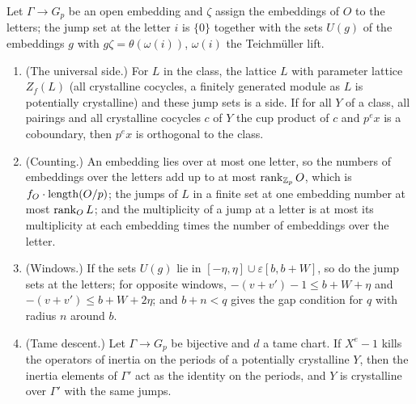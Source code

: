 \begin{lemma}\label{lem:universal-side}
Let $\Gamma\to G_p$ be an open embedding and $\zeta$ assign the embeddings of $O$ to the letters; the jump set at the letter $i$ is $\{0\}$ together with the sets $U(g)$ of the embeddings $g$ with $g\zeta=\theta(\omega(i))$, $\omega(i)$ the Teichm\"uller lift.
\begin{enumerate}[label=\textup{(\alph*)}]
\item (The universal side.) For $L$ in the class, the lattice $L$ with parameter lattice $Z_f(L)$ (all crystalline cocycles, a finitely generated module as $L$ is potentially crystalline) and these jump sets is a side. If for all $Y$ of a class, all pairings and all crystalline cocycles $c$ of $Y$ the cup product of
$c$ and $p^ex$ is a coboundary, then $p^ex$ is orthogonal to the class.
\item (Counting.) An embedding lies over at most one letter, so the numbers of embeddings over the letters add up to at most $\operatorname{rank}_{\mathbb{Z}_p}O$, which is $f_O\cdot\operatorname{length}(O/p)$; the jumps of $L$ in a finite set at one embedding number at most $\operatorname{rank}_OL$; and the multiplicity of a jump at a letter is at most its multiplicity at each
embedding times the number of embeddings over the letter.
\item (Windows.) If the sets $U(g)$ lie in $[-\eta,\eta]\cup\varepsilon[b,b+W]$, so do the jump sets at the letters; for opposite windows, $-(v+v')-1\le b+W+\eta$ and $-(v+v')\le b+W+2\eta$; and $b+n<q$ gives the gap condition for $q$ with radius $n$ around $b$.
\item (Tame descent.) Let $\Gamma\to G_p$ be bijective and $d$ a tame chart. If $X^e-1$ kills the operators of inertia on the periods of a potentially crystalline $Y$, then the inertia elements of $\Gamma'$ act as the identity on the periods, and $Y$ is crystalline over $\Gamma'$ with the same jumps.
\end{enumerate}
\end{lemma}


